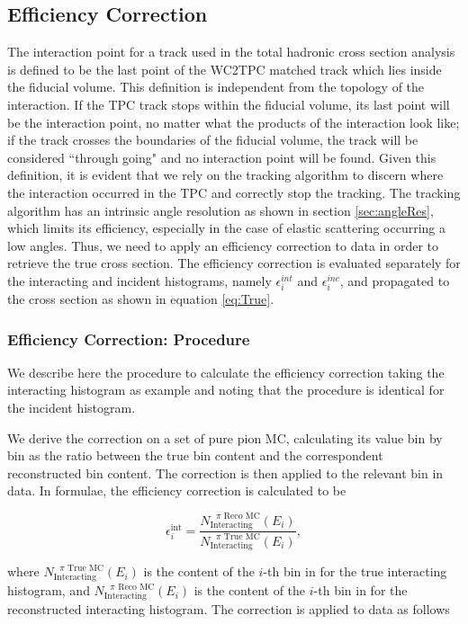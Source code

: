 \subsection{Efficiency Correction}\label{ch:EFFXS}
The interaction point for a track used in the total hadronic cross section analysis is defined to be the last point of the WC2TPC matched track which lies inside the fiducial volume. This definition is independent from the topology of the interaction. If the TPC track stops within the fiducial volume, its last point will be the interaction point, no matter what the products of the interaction look like; if the track crosses the boundaries of the fiducial volume, the track will be considered ``through going" and no interaction point will be found.  Given this definition, it is evident that we rely on the tracking algorithm to discern where the interaction occurred in the TPC  and correctly stop the tracking. The tracking algorithm has an intrinsic angle resolution as shown in section \ref{sec:angleRes}, which limits its efficiency, especially in the case of elastic scattering occurring a low angles. 
Thus, we need to apply an efficiency correction to data in order to retrieve the true cross section.  The efficiency correction is evaluated separately for the interacting and incident histograms, namely $\epsilon^{int}_i$ and  $\epsilon^{inc}_i$, and propagated to the cross section as shown in  equation \ref{eq:True}. 

\subsubsection{Efficiency Correction: Procedure}\label{sec:EffCorrection}
We describe here the procedure to calculate the efficiency correction taking the interacting histogram as example and noting that the procedure is identical for the  incident histogram. 

We derive the correction on a set of pure pion MC, calculating its value bin by bin as the ratio between the true bin content and the correspondent reconstructed bin content. The correction is then applied to the relevant bin in data. In formulae, the efficiency correction is calculated to be

\begin{equation}
\epsilon^{\text{int}}_i  =  \frac{N^{\text{ $\pi$ Reco MC}}_{\text{Interacting}} (E_{i})}{ N^{\text{ $\pi$ True MC}}_{\text{Interacting}} (E_{i})  },
\end{equation}
 
where $N^{\text{ $\pi$ True MC}}_{\text{Interacting}} (E_{i}) $ is the content of the $i$-th bin in for the true interacting histogram, and $N^{\text{ $\pi$ Reco MC}}_{\text{Interacting}} (E_{i}) $ is the content of the $i$-th bin in for the reconstructed interacting histogram. The correction is applied to data as follows

